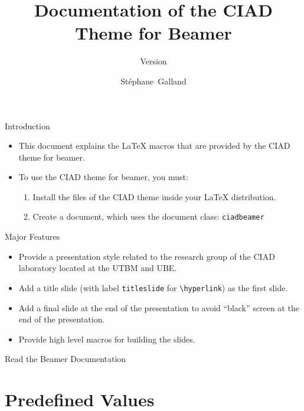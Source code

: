 \documentclass[english,sectioncirclenumberstyle]{ciadbeamer}
\title{Documentation of the CIAD Theme for Beamer}
\subtitle{Version \insertciadbeamerthemeversion}
\author[S.~Galland]{St\'ephane~Galland}
\begin{document}
\begin{frame}{Introduction}
	\begin{itemize}
	\item This document explains the {\LaTeX} macros that are provided by the CIAD theme for beamer.
	\vfill
	\item To use the CIAD theme for beamer, you must:
		\begin{enumerate}
		\item Install the files of the CIAD theme inside your {\LaTeX} distribution.
		\item Create a document, which uses the document class: \texttt{ciadbeamer}
		\end{enumerate}
	\end{itemize}
\end{frame}

\begin{frame}{Major Features}
	\begin{itemize}
	\item Provide a presentation style related to the research group of the CIAD laboratory located at the UTBM and UBE.
	\vfill
	\item Add a title slide (with label \texttt{titleslide} for \texttt{{\textbackslash}hyperlink}) as the first slide.
	\vfill
	\item Add a final slide at the end of the presentation to avoid ``black'' screen at the end of the presentation.
	\vfill
	\item Provide high level macros for building the slides.
	\end{itemize}
\end{frame}

\begin{frame}{Read the Beamer Documentation}
	\huge
	\vspace{2em}
\end{frame}

\tableofcontentslide

\section{Predefined Values}
\sectiontableofcontentslide
\end{document}
